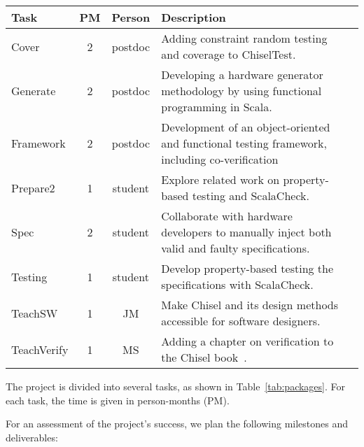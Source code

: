 \documentclass[fleqn,12pt]{article}
\begin{document}
\begin{table*}%
{\small
  \begin{center}
    \begin{tabular}{lccp{110mm}l}
      \toprule
      Task                   & PM  & Person    & Description                                                                                   \\
      \midrule
      Cover                  & 2  & postdoc      & Adding constraint random testing and coverage to ChiselTest.                     \\
      Generate               & 2   & postdoc      & Developing a hardware generator methodology by using functional programming in Scala.         \\
      Framework              & 2   & postdoc      & Development of an object-oriented and functional testing framework, including co-verification                     \\
      \midrule
      Prepare2                    & 1   & student      & Explore related work on property-based testing and ScalaCheck.                   \\
      Spec          & 2   & student      & Collaborate with hardware developers to manually inject both valid and faulty specifications. \\
      Testing & 1   & student      & Develop property-based testing the specifications with ScalaCheck.                                                      \\
      \midrule
      TeachSW                 &  1  & JM            & Make Chisel and its design methods accessible for software designers. \\
      TeachVerify                & 1   & MS        & Adding a chapter on verification to the Chisel book~\cite{chisel:book}.                     \\
      \bottomrule
    \end{tabular}
  \end{center}
  \caption{Tasks for ExHaaS}\label{tab:packages}
}
\end{table*}



The project is divided into several tasks, as shown in  Table~\ref{tab:packages}.
For each task, the time is given in person-months (PM).


For an assessment of the project's success, we plan the following milestones and deliverables:
\end{document}
